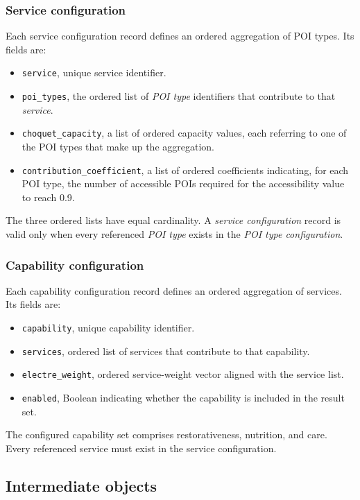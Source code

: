\documentclass{article}
\begin{document}
\subsubsection*{Service configuration}
Each service configuration record defines an ordered aggregation of POI types. Its fields are:
    \begin{itemize}
        \item \texttt{service}, unique service identifier.
        \item \texttt{poi\_types}, the ordered list of \emph{POI type} identifiers that contribute to that \emph{service}.
        \item \texttt{choquet\_capacity}, a list of ordered capacity values, each referring to one of the POI types that make up the aggregation.
        \item \texttt{contribution\_coefficient}, a list of ordered coefficients indicating, for each POI type, the number of accessible POIs required for the accessibility value to reach 0.9.
    \end{itemize}
The three ordered lists have equal cardinality. A \emph{service configuration} record is valid only when every referenced \emph{POI type} exists in the \emph{POI type configuration}.
\subsubsection*{Capability configuration}
    Each capability configuration record defines an ordered aggregation of
    services. Its fields are:
    \begin{itemize}
        \item \texttt{capability}, unique capability identifier.
        \item \texttt{services}, ordered list of services that contribute to that capability.
        \item \texttt{electre\_weight}, ordered service-weight vector aligned
        with the service list.
        \item \texttt{enabled}, Boolean indicating whether the capability is
        included in the result set.
    \end{itemize}
    The configured capability set comprises restorativeness, nutrition, and
    care. Every referenced service must exist in the service configuration.



\subsection{Intermediate objects}
\end{document}
